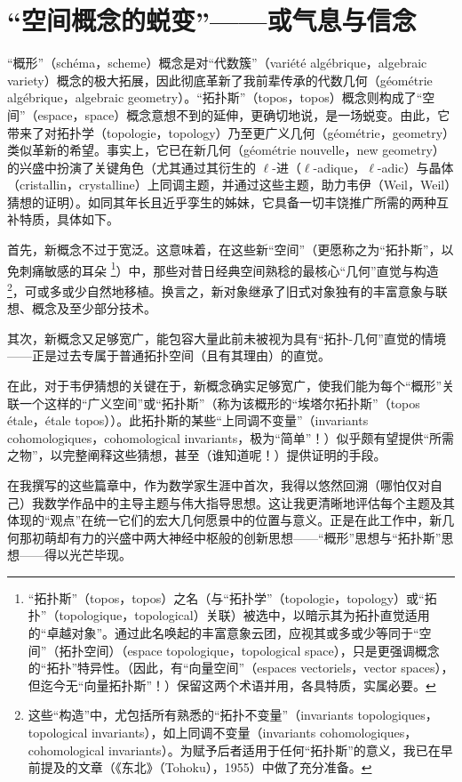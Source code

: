 \section{“空间概念的蜕变”——或气息与信念}

“概形”（schéma，scheme）概念是对“代数簇”（variété algébrique，algebraic variety）概念的极大拓展，因此彻底革新了我前辈传承的代数几何（géométrie algébrique，algebraic geometry）。“拓扑斯”（topos，topos）概念则构成了“空间”（espace，space）概念意想不到的延伸，更确切地说，是一场蜕变。由此，它带来了对拓扑学（topologie，topology）乃至更广义几何（géométrie，geometry）类似革新的希望。事实上，它已在新几何（géométrie nouvelle，new geometry）的兴盛中扮演了关键角色（尤其通过其衍生的 $\ell$-进（$\ell$-adique，$\ell$-adic）与晶体（cristallin，crystalline）上同调主题，并通过这些主题，助力韦伊（Weil，Weil）猜想的证明）。如同其年长且近乎孪生的姊妹，它具备一切丰饶推广所需的两种互补特质，具体如下。

首先，新概念不过于宽泛。这意味着，在这些新“空间”（更愿称之为“拓扑斯”，以免刺痛敏感的耳朵 \footnote{“拓扑斯”（topos，topos）之名（与“拓扑学”（topologie，topology）或“拓扑”（topologique，topological）关联）被选中，以暗示其为拓扑直觉适用的“卓越对象”。通过此名唤起的丰富意象云团，应视其或多或少等同于“空间”（拓扑空间）（espace topologique，topological space），只是更强调概念的“拓扑”特异性。（因此，有“向量空间”（espaces vectoriels，vector spaces），但迄今无“向量拓扑斯”！）保留这两个术语并用，各具特质，实属必要。}）中，那些对昔日经典空间熟稔的最核心“几何”直觉与构造 \footnote{这些“构造”中，尤包括所有熟悉的“拓扑不变量”（invariants topologiques，topological invariants），如上同调不变量（invariants cohomologiques，cohomological invariants）。为赋予后者适用于任何“拓扑斯”的意义，我已在早前提及的文章（《东北》（Tohoku），1955）中做了充分准备。}，可或多或少自然地移植。换言之，新对象继承了旧式对象独有的丰富意象与联想、概念及至少部分技术。

其次，新概念又足够宽广，能包容大量此前未被视为具有“拓扑-几何”直觉的情境——正是过去专属于普通拓扑空间（且有其理由）的直觉。

在此，对于韦伊猜想的关键在于，新概念确实足够宽广，使我们能为每个“概形”关联一个这样的“广义空间”或“拓扑斯”（称为该概形的“埃塔尔拓扑斯”（topos étale，étale topos））。此拓扑斯的某些“上同调不变量”（invariants cohomologiques，cohomological invariants，极为“简单”！）似乎颇有望提供“所需之物”，以完整阐释这些猜想，甚至（谁知道呢！）提供证明的手段。

在我撰写的这些篇章中，作为数学家生涯中首次，我得以悠然回溯（哪怕仅对自己）我数学作品中的主导主题与伟大指导思想。这让我更清晰地评估每个主题及其体现的“观点”在统一它们的宏大几何愿景中的位置与意义。正是在此工作中，新几何那初萌却有力的兴盛中两大神经中枢般的创新思想——“概形”思想与“拓扑斯”思想——得以光芒毕现。

